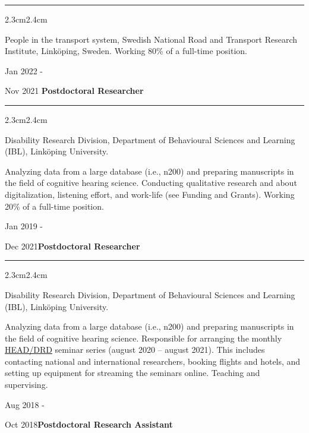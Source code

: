 \documentclass[]{article}
\begin{document}
\hrule
\begin{changemargin}{2.3cm}{2.4cm}

People in the transport system, Swedish National Road and Transport Research Institute, Linköping, Sweden. Working 80\% of a full-time position.


\end{changemargin}

Jan 2022 -

Nov 2021 \hspace{0.75cm}\textbf{Postdoctoral Researcher}\vspace{1mm}

\hrule
\begin{changemargin}{2.3cm}{2.4cm}

Disability Research Division, Department of Behavioural Sciences and Learning (IBL), Linköping University.

Analyzing data from a large database (i.e., n200) and preparing manuscripts in the field of cognitive hearing science. Conducting qualitative research and about digitalization, listening effort, and work-life (see Funding and Grants). Working 20\% of a full-time position.

\end{changemargin}

Jan 2019 -

Dec 2021\hspace{0.78cm}\textbf{Postdoctoral Researcher}\vspace{1mm}

\hrule
\begin{changemargin}{2.3cm}{2.4cm}

Disability Research Division, Department of Behavioural Sciences and Learning (IBL), Linköping University.

Analyzing data from a large database (i.e., n200) and preparing manuscripts in the field of cognitive hearing science. Responsible for arranging the monthly \href{https://liu.se/linnecentrum-head/en}{HEAD/DRD} seminar series (august 2020 – august 2021). This includes contacting national and international researchers, booking flights and hotels, and setting up equipment for streaming the seminars online. Teaching and supervising.

\end{changemargin}

Aug 2018 -

Oct
2018\hspace{0.75cm}\textbf{Postdoctoral Research Assistant}\vspace{1mm}
\end{document}
